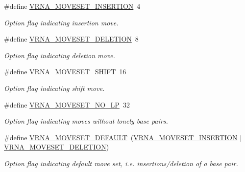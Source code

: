 \begin{DoxyCompactItemize}
\item 
\#define \hyperlink{group__neighbors_gaf39028db9c70d3be528929182a3f2d5a}{V\+R\+N\+A\+\_\+\+M\+O\+V\+E\+S\+E\+T\+\_\+\+I\+N\+S\+E\+R\+T\+I\+ON}~4
\begin{DoxyCompactList}\small\item\em Option flag indicating insertion move. \end{DoxyCompactList}\item 
\#define \hyperlink{group__neighbors_gac05db9392c6647e3e9a6982096c5b384}{V\+R\+N\+A\+\_\+\+M\+O\+V\+E\+S\+E\+T\+\_\+\+D\+E\+L\+E\+T\+I\+ON}~8
\begin{DoxyCompactList}\small\item\em Option flag indicating deletion move. \end{DoxyCompactList}\item 
\#define \hyperlink{group__neighbors_ga68ea27c81de4b74e48b775c04052590b}{V\+R\+N\+A\+\_\+\+M\+O\+V\+E\+S\+E\+T\+\_\+\+S\+H\+I\+FT}~16
\begin{DoxyCompactList}\small\item\em Option flag indicating shift move. \end{DoxyCompactList}\item 
\#define \hyperlink{group__neighbors_ga258084b251b218fba9398826435a4393}{V\+R\+N\+A\+\_\+\+M\+O\+V\+E\+S\+E\+T\+\_\+\+N\+O\+\_\+\+LP}~32
\begin{DoxyCompactList}\small\item\em Option flag indicating moves without lonely base pairs. \end{DoxyCompactList}\item 
\#define \hyperlink{group__neighbors_gaa5ffec4dd0d02df320f123e6888154d1}{V\+R\+N\+A\+\_\+\+M\+O\+V\+E\+S\+E\+T\+\_\+\+D\+E\+F\+A\+U\+LT}~(\hyperlink{group__neighbors_gaf39028db9c70d3be528929182a3f2d5a}{V\+R\+N\+A\+\_\+\+M\+O\+V\+E\+S\+E\+T\+\_\+\+I\+N\+S\+E\+R\+T\+I\+ON} $\vert$ \hyperlink{group__neighbors_gac05db9392c6647e3e9a6982096c5b384}{V\+R\+N\+A\+\_\+\+M\+O\+V\+E\+S\+E\+T\+\_\+\+D\+E\+L\+E\+T\+I\+ON})
\begin{DoxyCompactList}\small\item\em Option flag indicating default move set, i.\+e. insertions/deletion of a base pair. \end{DoxyCompactList}\end{DoxyCompactItemize}
